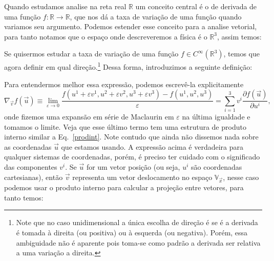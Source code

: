 Quando estudamos analise na reta real $\mathbb{R}$ um conceito central é o de
derivada de uma função $f:\mathbb{R}\to\mathbb{R}$, que nos dá a taxa de
variação de uma função quando variamos seu argumento. Podemos estender esse
conceito para a analise vetorial, para tanto notamos que o espaço onde
descreveremos a física é o $\mathbb{R}^3$, assim temos:


Se quisermos estudar a taxa de variação de uma função $f\in
	C^\infty\left(\mathbb{R}^3\right)$, temos que agora definir em qual
direção.\footnote{Note que no caso unidimensional a única escolha de direção é
	se é a derivada é tomada à direita (ou positiva) ou à esquerda (ou negativa).
	Porém, essa ambiguidade não é aparente pois toma-se como padrão a derivada ser
	relativa a uma variação a direita.} Dessa forma, introduzimos a seguinte
definição:

Para entendermos melhor essa expressão, podemos escrevê-la explicitamente
\begin{equation}\label{limgrad}
	\nabla_{\vec{v}}f(\vec{u}) \equiv \lim_{\varepsilon\to0} \frac{f(u^1+\varepsilon v^1, u^2+\varepsilon v^2,u^3+\varepsilon v^3)-f(u^1, u^2,u^3)}{\varepsilon} = \sum_{i=1}^3v^i\frac{\partial f (\vec{u})}{\partial u^i},
\end{equation}
onde fizemos uma expansão em série de Maclaurin em $\varepsilon$ na última
igualdade e tomamos o limite. Veja que esse último termo tem uma estrutura de
produto interno similar a Eq.~\eqref{prodint}. Note contudo que ainda não
dissemos nada sobre as coordenadas $\vec{u}$ que estamos usando. A expressão
acima é verdadeira para qualquer sistemas de coordenadas, porém, é preciso ter
cuidado com o significado das componentes $v^i$. Se $\vec{u}$ for um vetor
posição (ou seja, $u^i$ são coordenadas cartesianas), então $\vec{v}$ representa
um vetor deslocamento no espaço $\mathbb{V}_{\vec{x}}$, nesse caso podemos usar
o produto interno para calcular a projeção entre vetores, para tanto temos:

